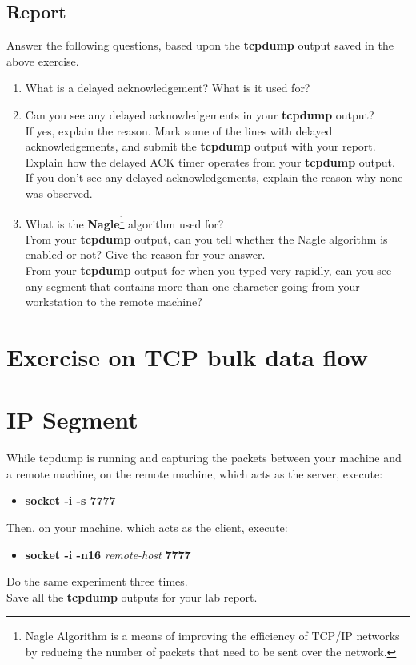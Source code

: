 \documentclass{../UTNetLab}
\begin{document}
    \subsection*{Report}
    Answer the following questions, based upon the \textbf{tcpdump} output saved in the above exercise.
    \begin{enumerate}
        \item What is a delayed acknowledgement?
        What is it used for?
        \item Can you see any delayed acknowledgements in your \textbf{tcpdump} output? \\
        If yes, explain the reason.
        Mark some of the lines with delayed acknowledgements, and submit the \textbf{tcpdump} output with your report. \\
        Explain how the delayed ACK timer operates from your \textbf{tcpdump} output. \\
        If you don’t see any delayed acknowledgements, explain the reason why none was observed.
        \item What is the \textbf{Nagle}\footnote{Nagle Algorithm is a means of improving the efficiency of TCP/IP networks by reducing the number of packets that need to be sent over the network.} algorithm used for? \\
        From your \textbf{tcpdump} output, can you tell whether the Nagle algorithm is enabled or not? Give the reason for your answer.\\
        From your \textbf{tcpdump} output for when you typed very rapidly, can you see any segment that contains more than one character going from your workstation to the remote machine?
    \end{enumerate}

\section*{Exercise on TCP bulk data flow}
\section{IP Segment}
    While tcpdump is running and capturing the packets between your machine and a remote machine, on the remote machine, which acts as the server, execute:
    \begin{itemize}
        \item \textbf{socket -i -s 7777}
    \end{itemize}
    Then, on your machine, which acts as the client, execute:
    \begin{itemize}
        \item \textbf{socket -i -n16} \textit{remote-host} \textbf{7777}
    \end{itemize}
    Do the same experiment three times. \\
    \underline{Save} all the \textbf{tcpdump} outputs for your lab report.
\end{document}
